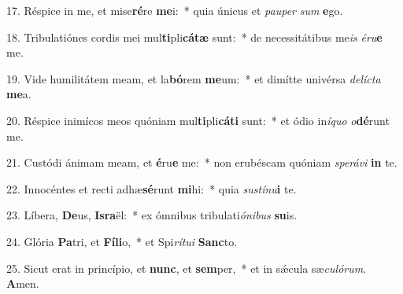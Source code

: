 17. Réspice in me, et mise\textbf{ré}re \textbf{me}i:~*  quia únicus et \textit{pau}\textit{per} \textit{sum} \textbf{e}go.\

18. Tribulatiónes cordis mei mul\textbf{ti}pli\textbf{cá}\textbf{tæ} sunt:~*  de necessitátibus me\textit{is} \textit{é}\textit{ru}\textbf{e} me.\

19. Vide humilitátem meam, et la\textbf{bó}rem \textbf{me}um:~*  et dimítte univérsa \textit{de}\textit{líc}\textit{ta} \textbf{me}a.\

20. Réspice inimícos meos quóniam mul\textbf{ti}pli\textbf{cá}\textbf{ti} sunt:~*  et ódio in\textit{í}\textit{quo} \textit{o}\textbf{dé}runt me.\

21. Custódi ánimam meam, et \textbf{é}ru\textbf{e} me:~*  non erubéscam quóniam \textit{spe}\textit{rá}\textit{vi} \textbf{in} te.\

22. Innocéntes et recti adhæ\textbf{sé}runt \textbf{mi}hi:~*  quia \textit{sus}\textit{tí}\textit{nu}\textbf{i} te.\

23. Líbera, \textbf{De}us, \textbf{Is}\textbf{ra}ël:~*  ex ómnibus tribulati\textit{ó}\textit{ni}\textit{bus} \textbf{su}is.\

24. Glória \textbf{Pa}tri, et \textbf{Fí}\textbf{li}o,~*  et Spi\textit{rí}\textit{tu}\textit{i} \textbf{Sanc}to.\

25. Sicut erat in princípio, et \textbf{nunc}, et \textbf{sem}per,~*  et in sǽcula sæ\textit{cu}\textit{ló}\textit{rum}. \textbf{A}men.\

